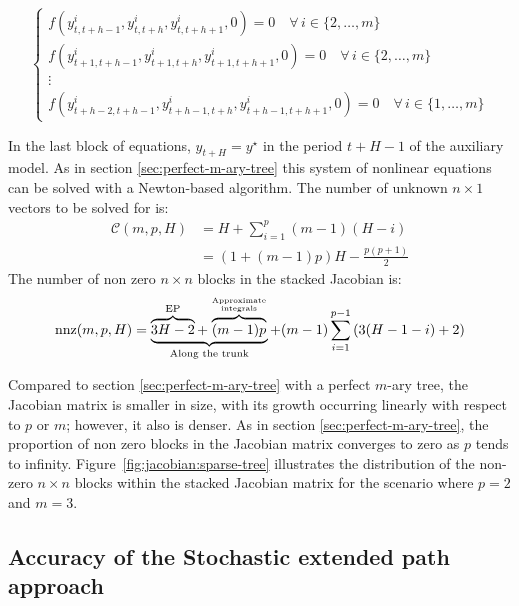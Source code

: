 \documentclass[a4paper,11pt]{amsart}
\begin{document}
\begin{equation}
   \label{sep:sparse:5}\tag{5.f}
   \begin{cases}
      f\left(y_{t,t+h-1}^i, y_{t,t+h}^i, y_{t,t+h+1}^i, 0\right) = 0 \quad \forall\, i\in\{2,\ldots,m\}        \\
      f\left(y_{t+1,t+h-1}^i, y_{t+1,t+h}^i, y_{t+1, t+h+1}^i, 0\right) = 0 \quad \forall\, i\in\{2,\ldots,m\} \\
      \vdots                                                                                                   \\
      f\left(y_{t+h-2,t+h-1}^i, y_{t+h-1,t+h}^i, y_{t+h-1,t+h+1}^i, 0 \right) = 0 \quad \forall\, i\in\{1,\ldots,m\}
   \end{cases}
\end{equation}

In the last block of equations, \(y_{t+H} = y^{\star}\) in the
period \( t+H-1 \) of the auxiliary model. As in section
\ref{sec:perfect-m-ary-tree} this system of nonlinear equations can be
solved with a Newton-based algorithm. The number of
unknown $n\times 1$ vectors to be solved for is:
\[
   \begin{split}
      {\mathcal C}(m,p,H) & =  H+\sum_{i=1}^p(m-1)(H-i)                     \\
                          & = \left( 1 + (m-1)p \right)H - \frac{p(p+1)}{2}
   \end{split}
\]
The number of non zero $n\times n$ blocks in the stacked Jacobian is:
\[
   \mathrm{nnz}(m,p,H) = \underbrace{\overbrace{3H-2}^{\mathrm{EP}} + \overbrace{(m-1)p}^{\text{Approximate} \atop \text{integrals} }}_{\text{Along the trunk}} + (m-1)\sum_{i=1}^{p-1} \left( 3(H-1-i)+2  \right)
\]

Compared to section \ref{sec:perfect-m-ary-tree} with a
perfect $m$-ary tree, the Jacobian matrix is smaller in size, with its
growth occurring linearly with respect to \( p \) or \( m \); however,
it also is denser. As in section \ref{sec:perfect-m-ary-tree}, the
proportion of non zero blocks in the Jacobian matrix converges to zero
as $p$ tends to infinity. Figure~\ref{fig:jacobian:sparse-tree} illustrates the
distribution of the non-zero $n \times n$ blocks within the stacked
Jacobian matrix for the scenario where \( p = 2 \) and \( m = 3 \).


\subsection{Accuracy of the Stochastic extended path approach}
\end{document}

